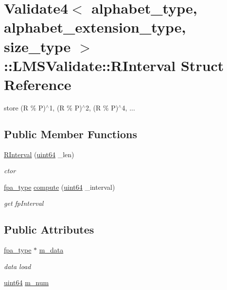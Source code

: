 \hypertarget{struct_validate4_1_1_l_m_s_validate_1_1_r_interval}{}\section{Validate4$<$ alphabet\+\_\+type, alphabet\+\_\+extension\+\_\+type, size\+\_\+type $>$\+:\+:L\+M\+S\+Validate\+:\+:R\+Interval Struct Reference}
\label{struct_validate4_1_1_l_m_s_validate_1_1_r_interval}


store (R \% P)$^\wedge$1, (R \% P)$^\wedge$2, (R \% P)$^\wedge$4, ...  


\subsection*{Public Member Functions}
\begin{DoxyCompactItemize}
\item 
\hyperlink{struct_validate4_1_1_l_m_s_validate_1_1_r_interval_ababcb7e5df16b2bd27a8b6285ccab230}{R\+Interval} (\hyperlink{types_8h_a60e8696a4678cd348e991a1f172e53f7}{uint64} \+\_\+len)
\begin{DoxyCompactList}\small\item\em ctor \end{DoxyCompactList}\item 
\hyperlink{common_8h_a7fdaf8b9b3d2f6ae6b10597a8d3f96ee}{fpa\+\_\+type} \hyperlink{struct_validate4_1_1_l_m_s_validate_1_1_r_interval_a7c1aee0f298285e1eb0df8b3ab368036}{compute} (\hyperlink{types_8h_a60e8696a4678cd348e991a1f172e53f7}{uint64} \+\_\+interval)
\begin{DoxyCompactList}\small\item\em get fp\+Interval \end{DoxyCompactList}\end{DoxyCompactItemize}
\subsection*{Public Attributes}
\begin{DoxyCompactItemize}
\item 
\hyperlink{common_8h_a7fdaf8b9b3d2f6ae6b10597a8d3f96ee}{fpa\+\_\+type} $\ast$ \hyperlink{struct_validate4_1_1_l_m_s_validate_1_1_r_interval_ac666861e46f85b525452722ee93e6ff0}{m\+\_\+data}
\begin{DoxyCompactList}\small\item\em data load \end{DoxyCompactList}\item 
\hyperlink{types_8h_a60e8696a4678cd348e991a1f172e53f7}{uint64} \hyperlink{struct_validate4_1_1_l_m_s_validate_1_1_r_interval_ac1b3892751cdcfaa18b45203a247ffc5}{m\+\_\+num}
\end{DoxyCompactItemize}


